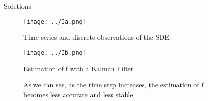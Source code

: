\documentclass[a4paper,notitlepage,cs4size,cap,indent,oneside,12pt]{article}
\numberwithin{equation}{section}
\numberwithin{figure}{section}
\newcommand{\blue}{\color{blue}}
\begin{document}
{\blue
\noindent Solutions: \\

\begin{figure}[htbp]
  \centering
  \texttt{[image: ../3a.png]}
  \caption{Time series and discrete observations of the SDE.}
  \label{fig:3a}
\end{figure}

\begin{figure}[htbp]
  \centering
  \texttt{[image: ../3b.png]}
  \caption{Estimation of f with a Kalman Filter}
  \label{fig:3b}
\end{figure}

\begin{figure}[htbp]
  \centering
  \hfill
  \hfill
  \caption{As we can see, as the time step increases, the estimation of f becomes less accurate and less stable}
  \label{fig:fig3}
\end{figure}
}
\end{document}
